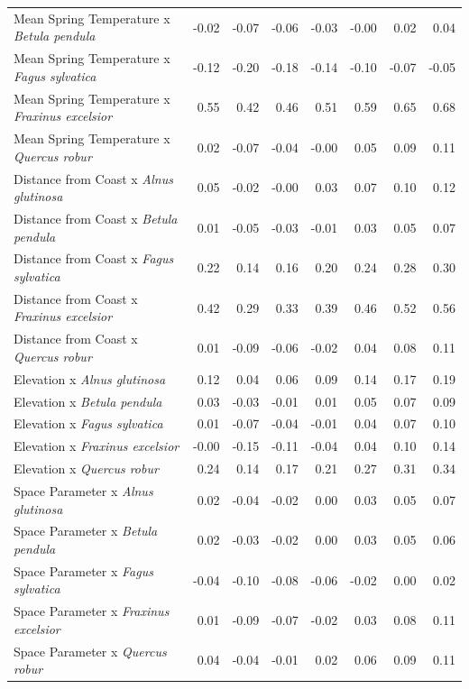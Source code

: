 \documentclass{article}\usepackage[]{graphicx}\usepackage[]{color}
\begin{document}
\begin{longtable}{lrrrrrrr}
  Mean Spring 
Temperature
x\textit{ Betula pendula} & -0.02 & -0.07 & -0.06 & -0.03 & -0.00 & 0.02 & 0.04 \\ 
  Mean Spring 
Temperature
x\textit{ Fagus sylvatica} & -0.12 & -0.20 & -0.18 & -0.14 & -0.10 & -0.07 & -0.05 \\ 
  Mean Spring 
Temperature
x\textit{ Fraxinus excelsior} & 0.55 & 0.42 & 0.46 & 0.51 & 0.59 & 0.65 & 0.68 \\ 
  Mean Spring 
Temperature
x\textit{ Quercus robur} & 0.02 & -0.07 & -0.04 & -0.00 & 0.05 & 0.09 & 0.11 \\ 
  Distance from 
Coast
x\textit{ Alnus glutinosa} & 0.05 & -0.02 & -0.00 & 0.03 & 0.07 & 0.10 & 0.12 \\ 
  Distance from 
Coast
x\textit{ Betula pendula} & 0.01 & -0.05 & -0.03 & -0.01 & 0.03 & 0.05 & 0.07 \\ 
  Distance from 
Coast
x\textit{ Fagus sylvatica} & 0.22 & 0.14 & 0.16 & 0.20 & 0.24 & 0.28 & 0.30 \\ 
  Distance from 
Coast
x\textit{ Fraxinus excelsior} & 0.42 & 0.29 & 0.33 & 0.39 & 0.46 & 0.52 & 0.56 \\ 
  Distance from 
Coast
x\textit{ Quercus robur} & 0.01 & -0.09 & -0.06 & -0.02 & 0.04 & 0.08 & 0.11 \\ 
  Elevation
x\textit{ Alnus glutinosa} & 0.12 & 0.04 & 0.06 & 0.09 & 0.14 & 0.17 & 0.19 \\ 
  Elevation
x\textit{ Betula pendula} & 0.03 & -0.03 & -0.01 & 0.01 & 0.05 & 0.07 & 0.09 \\ 
  Elevation
x\textit{ Fagus sylvatica} & 0.01 & -0.07 & -0.04 & -0.01 & 0.04 & 0.07 & 0.10 \\ 
  Elevation
x\textit{ Fraxinus excelsior} & -0.00 & -0.15 & -0.11 & -0.04 & 0.04 & 0.10 & 0.14 \\ 
  Elevation
x\textit{ Quercus robur} & 0.24 & 0.14 & 0.17 & 0.21 & 0.27 & 0.31 & 0.34 \\ 
  Space Parameter
x\textit{ Alnus glutinosa} & 0.02 & -0.04 & -0.02 & 0.00 & 0.03 & 0.05 & 0.07 \\ 
  Space Parameter
x\textit{ Betula pendula} & 0.02 & -0.03 & -0.02 & 0.00 & 0.03 & 0.05 & 0.06 \\ 
  Space Parameter
x\textit{ Fagus sylvatica} & -0.04 & -0.10 & -0.08 & -0.06 & -0.02 & 0.00 & 0.02 \\ 
  Space Parameter
x\textit{ Fraxinus excelsior} & 0.01 & -0.09 & -0.07 & -0.02 & 0.03 & 0.08 & 0.11 \\ 
  Space Parameter
x\textit{ Quercus robur} & 0.04 & -0.04 & -0.01 & 0.02 & 0.06 & 0.09 & 0.11 \\ 

\end{longtable}
\end{document}

